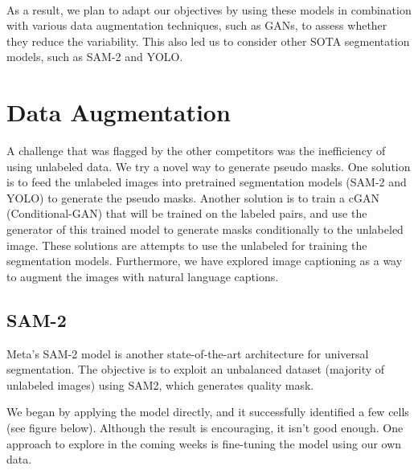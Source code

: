 \documentclass[]{article}
\begin{document}
\\As a result, we plan to adapt our objectives by using these models in combination with various data augmentation techniques, such as GANs, to assess whether they reduce the variability. This also led us to consider other SOTA segmentation models, such as SAM-2 and YOLO.

\section{Data Augmentation}
A challenge that was flagged by the other competitors was the inefficiency of using unlabeled data. We try a novel way to generate pseudo masks. One solution is to feed the unlabeled images into pretrained segmentation models (SAM-2 and YOLO) to generate the pseudo masks. Another solution is to train a cGAN (Conditional-GAN) that will be trained on the labeled pairs, and use the generator of this trained model to generate masks conditionally to the unlabeled image. 
These solutions are attempts to use the unlabeled for training the segmentation models. Furthermore, we have explored image captioning as a way to augment the images with natural language captions.
\subsection{SAM-2}
Meta's SAM-2 model is another state-of-the-art architecture for universal segmentation. The objective is to exploit an unbalanced dataset (majority of unlabeled images) using SAM2, which generates quality mask.

We began by applying the model directly, and it successfully identified a few cells (see figure below). Although the result is encouraging, it isn't good enough. One approach to explore in the coming weeks is fine-tuning the model using our own data.
\end{document}
